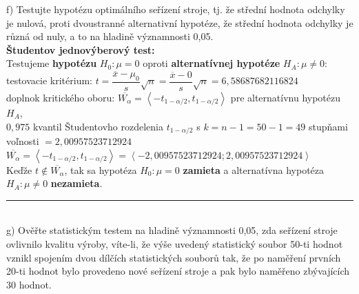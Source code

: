 \documentclass[pdftex, 11pt, a4paper, titlepage]{article}
\begin{document}
    \noindent
    f) Testujte hypotézu optimálního seřízení stroje, tj. že střední hodnota
    odchylky je nulová, proti dvoustranné alternativní hypotéze, že střední
    hodnota odchylky je různá od nuly, a to na hladině významnosti 0,05.\\

    \noindent
    \textbf{Študentov jednovýberový test:}\\
    \noindent
    Testujeme \textbf{hypotézu} $H_0:\mu = 0$ oproti \textbf{alternatívnej hypotéze} $H_A:\mu \neq 0$:\\

    \noindent
    testovacie kritérium: $t = \dfrac{\overline{x}-\mu_0}{s} \sqrt{n} = \dfrac{\overline{x}-0}{s} \sqrt{n} = 6,58687682116824$\\
    
    \noindent
    doplnok kritického oboru: $\overline{W_\alpha} = \left\langle -t_{1-\alpha/2}, t_{1-\alpha/2} \right\rangle$ pre alternatívnu hypotézu $H_A$,\\
    $0,975$ kvantil Študentovho rozdelenia $t_{1-\alpha/2}$ s $k=n-1=50-1=49$ stupňami voľnosti $=2,00957523712924$\\
    $\overline{W_\alpha} = \left\langle -t_{1-\alpha/2}, t_{1-\alpha/2} \right\rangle = \left\langle -2,00957523712924 ; 2,00957523712924\right\rangle$\\

    \noindent
    Keďže $t \notin \overline{W_\alpha}$, tak sa hypotéza $H_0 : \mu = 0$ \textbf{zamieta} a alternatívna hypotéza $H_A:\mu \neq 0$ \textbf{nezamieta}.\\

    \noindent\rule{\linewidth}{0.4pt}\\
    g) Ověřte statistickým testem na hladině významnosti 0,05, zda seřízení
    stroje ovlivnilo kvalitu výroby, víte-li, že výše uvedený statistický soubor
    50-ti hodnot vznikl spojením dvou dílčích statistických souborů tak,
    že po naměření prvních 20-ti hodnot bylo provedeno nové seřízení stroje
    a pak bylo naměřeno zbývajících 30 hodnot.\\
\end{document}
